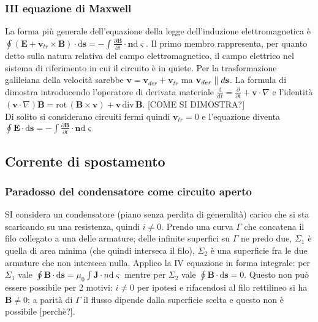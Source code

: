\documentclass[11pt,a4paper]{article}
\newcommand{\de}{\mathrm d}
\newcommand{\fracd}[2]{\frac{\de #1}{\de #2}}
\newcommand{\fracp}[2]{\frac{\partial #1}{\partial #2}}
\newcommand{\dive}[1]{\text{div}\,#1}
\newcommand{\rot}[1]{\text{rot}\,#1}
\begin{document}
\subsubsection{III equazione di Maxwell}
La forma più generale dell'equazione della legge dell'induzione elettromagnetica è $\oint (\mathbf E + \mathbf v_{tr} \times \mathbf B) \cdot \de\mathbf s = -\int \fracp{\mathbf B}{t} \cdot \mathbf n \de\varsigma$. Il primo membro rappresenta, per quanto detto sulla natura relativa del campo elettromagnetico, il campo elettrico nel sistema di riferimento in cui il circuito è in quiete. Per la trasformazione galileiana della velocità sarebbe $\mathbf v = \mathbf v_{der} + \mathbf v_{tr}$ ma $\mathbf v_{der} \parallel \mathbf \de\mathbf s$. \scriptsize La formula di dimostra introducendo l'operatore di derivata materiale $\fracd{}{t} = \fracp{}{t} + \mathbf v \cdot \nabla$ e l'identità $(\mathbf v \cdot \nabla)\mathbf B = \rot(\mathbf B \times \mathbf v) + \mathbf v\, \dive\mathbf B$.  [COME SI DIMOSTRA?]\normalsize\\
Di solito si considerano circuiti fermi quindi $\mathbf v_{tr} = 0$ e l'equazione diventa $\oint \mathbf E \cdot \de\mathbf s = -\int \fracp{\mathbf B}{t} \cdot \mathbf n \de\varsigma$

\subsection{Corrente di spostamento}
\subsubsection{Paradosso del condensatore come circuito aperto}
SI considera un condensatore (piano senza perdita di generalità) carico che si sta scaricando su una resistenza, quindi $i \neq 0$. Prendo una curva $\Gamma$ che concatena il filo collegato a una delle armature; delle infinite superfici su $\Gamma$ ne predo due, $\Sigma_1$ è quella di area minima (che quindi interseca il filo), $\Sigma_2$ è una superficie fra le due armature che non interseca nulla. Applico la IV equazione in forma integrale: per $\Sigma_1$ vale $\oint \mathbf B \cdot \de\mathbf s = \mu_0 \int \mathbf J \cdot n\de\varsigma$ mentre per $\Sigma_2$ vale $\oint \mathbf B \cdot \de\mathbf s = 0$. Questo non può essere possibile per 2 motivi: $i \neq 0$ per ipotesi e rifacendosi al filo rettilineo si ha $\mathbf B \neq 0$; a parità di $\Gamma$ il flusso dipende dalla superficie scelta e questo non è possibile [perchè?].
\end{document}
